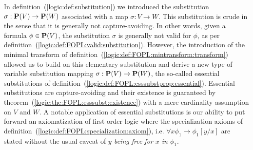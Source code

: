 In definition~(\ref{logic:def:substitution}) we introduced the
substitution $\sigma:\mbox{${\bf P}(V)$}\to{\bf P}(W)$ associated with a map
$\sigma:V\to W$. This substitution is crude in the sense that it is
generally not capture-avoiding. In other words, given a formula
$\phi\in\mbox{${\bf P}(V)$}$, the substitution $\sigma$ is generally not valid for
$\phi$, as per definition~(\ref{logic:def:FOPL:valid:substitution}).
However, the introduction of the minimal transform of
definition~(\ref{logic:def:FOPL:mintransform:transform}) allowed us
to build on this elementary substitution and derive a new type of
variable substitution mapping $\sigma:\mbox{${\bf P}(V)$}\to{\bf P}(W)$, the
so-called essential substitutions of
definition~(\ref{logic:def:FOPL:esssubstprop:essential}). Essential
substitutions are capture-avoiding and their existence is guaranteed
by theorem~(\ref{logic:the:FOPL:esssubst:existence}) with a mere
cardinality assumption on $V$ and $W$. A notable application of
essential substitutions is our ability to put forward an
axiomatization of first order logic where the specialization axioms
of definition~(\ref{logic:def:FOPL:specialization:axiom}), i.e.
$\forall x\phi_{1}\to\phi_{1}[y/x]$ are stated without the usual
caveat of {\em $y$ being free for $x$ in $\phi_{1}$}.

